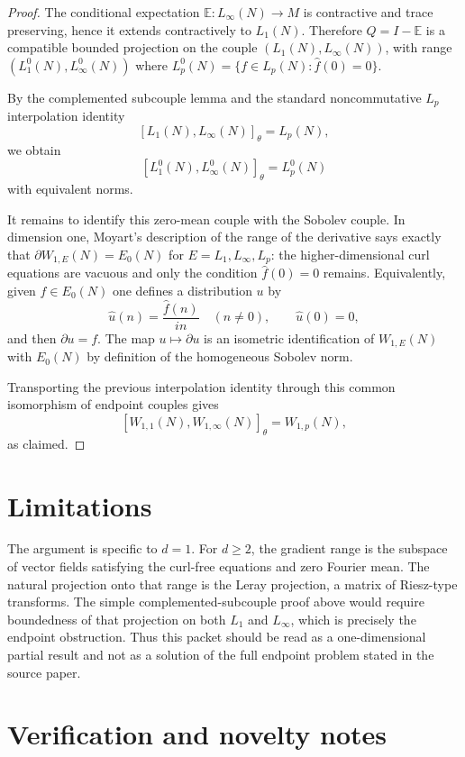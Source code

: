 \documentclass[11pt]{article}
\begin{document}
\begin{proof}
The conditional expectation $\mathbb E:L_\infty(N)\to M$ is contractive and
trace preserving, hence it extends contractively to $L_1(N)$. Therefore
$Q=I-\mathbb E$ is a compatible bounded projection on the couple
$(L_1(N),L_\infty(N))$, with range $(L_1^0(N),L_\infty^0(N))$ where
$L_p^0(N)=\{f\in L_p(N):\widehat f(0)=0\}$.

By the complemented subcouple lemma and the standard noncommutative
$L_p$ interpolation identity
\[
  [L_1(N),L_\infty(N)]_\theta=L_p(N),
\]
we obtain
\[
  [L_1^0(N),L_\infty^0(N)]_\theta=L_p^0(N)
\]
with equivalent norms.

It remains to identify this zero-mean couple with the Sobolev couple. In
dimension one, Moyart's description of the range of the derivative says exactly
that $\partial W_{1,E}(N)=E_0(N)$ for $E=L_1,L_\infty,L_p$: the higher-dimensional
curl equations are vacuous and only the condition $\widehat f(0)=0$ remains.
Equivalently, given $f\in E_0(N)$ one defines a distribution $u$ by
\[
  \widehat u(n)=\frac{\widehat f(n)}{in}\quad(n\neq 0),\qquad \widehat u(0)=0,
\]
and then $\partial u=f$. The map $u\mapsto \partial u$ is an isometric
identification of $W_{1,E}(N)$ with $E_0(N)$ by definition of the homogeneous
Sobolev norm.

Transporting the previous interpolation identity through this common
isomorphism of endpoint couples gives
\[
  [W_{1,1}(N),W_{1,\infty}(N)]_\theta=W_{1,p}(N),
\]
as claimed.
\end{proof}

\section*{Limitations}

The argument is specific to $d=1$. For $d\geq 2$, the gradient range is the
subspace of vector fields satisfying the curl-free equations and zero Fourier
mean. The natural projection onto that range is the Leray projection, a matrix
of Riesz-type transforms. The simple complemented-subcouple proof above would
require boundedness of that projection on both $L_1$ and $L_\infty$, which is
precisely the endpoint obstruction. Thus this packet should be read as a
one-dimensional partial result and not as a solution of the full endpoint
problem stated in the source paper.

\section*{Verification and novelty notes}
\end{document}
